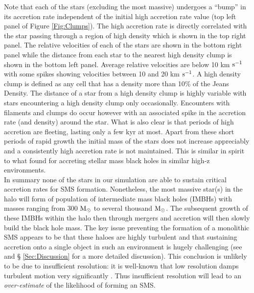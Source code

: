 \documentclass[twocolumn,iop,revtex4]{openjournal}
\newcommand{\kms} {km $\rm{s^{-1}}$}
\newcommand{\msolar} {$\rm{M_{\odot}}~$}
\newcommand{\msolarc} {$\rm{M_{\odot}}$}
\begin{document}
Note that each of the stars (excluding the most massive) undergoes a ``bump'' in its accretion rate independent of the initial high accretion
rate value (top left panel of Figure \ref{Fig:Clumps}). The high accretion rate is directly correlated with the star
passing through a region of high density which is shown in the top right panel. The relative velocities of each of the stars
are shown in the bottom right panel while the distance from each star to the nearest high density clump is
shown in the bottom left panel. Average relative velocities are below 10 \kms{} with some spikes showing
velocities between 10 and 20 \kms. A high density clump is defined as any cell that has a density more than
10\% of the  Jeans Density. The distance of a star from a high density clump is highly variable with stars
encountering a high density clump only occasionally. Encounters
with filaments and clumps do occur however with an associated spike in
the accretion rate (and density) around the star.
What is also clear is that periods of high accretion are fleeting, lasting only a few kyr at most. Apart from these
short periods of rapid growth the initial mass of the
stars does not increase appreciably and a consistently high accretion rate is not maintained. This is similar in
spirit to what \cite{Smith_2018} found for accreting stellar mass black holes in similar high-z environments.\\
\indent In summary none of the stars in our simulation are able to sustain critical accretion rates
  for SMS formation. Nonetheless, the most massive star(s) in the halo will form of population of
  intermediate mass black holes (IMBHs) with masses ranging from 300 \msolar to several thousand \msolarc.
The subsequent
growth of these IMBHs within the halo then through 
mergers and accretion will then slowly build the black hole mass. 
The key issue preventing the formation of a monolithic SMS appears to be that
these haloes are highly turbulent and that sustaining accretion onto a single
object in such an environment is hugely challenging (see \cite{Chon_2017b} and \S
\ref{Sec:Discussion} for a more detailed discussion).
This conclusion is unlikely to be due to insufficient resolution: it is
well-known that low resolution damps turbulent motion very significantly
\citep[e.g.][]{Federrath_2010a, Downes_2012}. Thus insufficient resolution
will lead to an {\it over-estimate} of the likelihood of forming an SMS.
\end{document}
